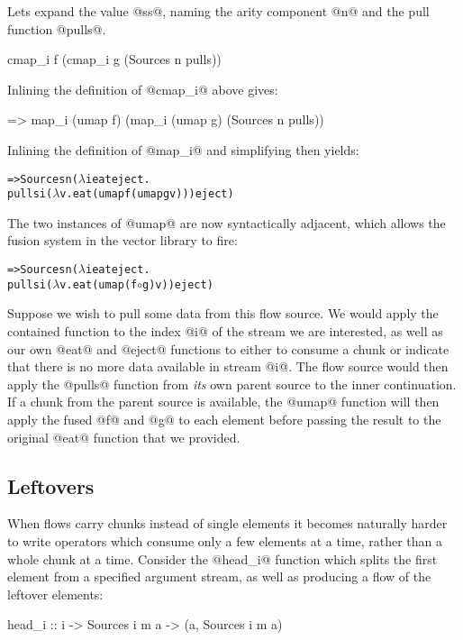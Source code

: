 Lets expand the value @ss@, naming the arity component @n@ and the pull function @pulls@.
\begin{code}
   cmap_i f (cmap_i g (Sources n pulls))
\end{code}

Inlining the definition of @cmap_i@ above gives:
\begin{code}
=> map_i (umap f) (map_i (umap g) (Sources n pulls))
\end{code}

Inlining the definition of @map_i@ and simplifying then yields:
\begin{alltt}
=> Sources n (\(\lambda\)i eat eject.
     pulls i (\(\lambda\)v. eat (umap f (umap g v))) eject)
\end{alltt}
The two instances of @umap@ are now syntactically adjacent, which allows the fusion system in the vector library to fire:

\begin{alltt}
=> Sources n (\(\lambda\)i eat eject.
     pulls i (\(\lambda\)v. eat (umap (f \(\circ\) g) v)) eject)
\end{alltt}

Suppose we wish to pull some data from this flow source. We would apply the contained function to the index @i@ of the stream we are interested, as well as our own @eat@ and @eject@ functions to either to consume a chunk or indicate that there is no more data available in stream @i@. The flow source would then apply the @pulls@ function from \emph{its} own parent source to the inner continuation. If a chunk from the parent source is available, the @umap@ function will then apply the fused @f@ and @g@ to each element before passing the result to the original @eat@ function that we provided.


\subsection{Leftovers}
When flows carry chunks instead of single elements it becomes naturally harder to write operators which consume only a few elements at a time, rather than a whole chunk at a time. Consider the @head_i@ function which splits the first element from a specified argument stream, as well as producing a flow of the leftover elements:
\begin{code}
 head_i :: i -> Sources i m a -> (a, Sources i m a)
\end{code}

